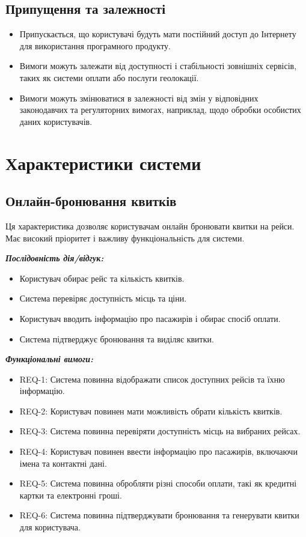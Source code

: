 \documentclass[14pt]{extreport}
\begin{document}
\begin{normalsize}
	\subsection*{Припущення та залежності}
	\begin{itemize}
		\item Припускається, що користувачі будуть мати постійний доступ до Інтернету для використання програмного продукту.
		\item Вимоги можуть залежати від доступності і стабільності зовнішніх сервісів, таких як системи оплати або послуги геолокації.
		\item Вимоги можуть змінюватися в залежності від змін у відповідних законодавчих та регуляторних вимогах, наприклад, щодо обробки особистих даних користувачів.
	\end{itemize}
	
	\section*{Характеристики системи}
	
	\subsection*{Онлайн-бронювання квитків} 
	Ця характеристика дозволяє користувачам онлайн бронювати квитки на рейси. Має високий пріоритет і важливу функціональність для системи.
	
	\textbf{\textit{Послідовність дія/відгук:}}
	\begin{itemize}
		\item Користувач обирає рейс та кількість квитків.
		\item Система перевіряє доступність місць та ціни.
		\item Користувач вводить інформацію про пасажирів і обирає спосіб оплати.
		\item Система підтверджує бронювання та виділяє квитки.
	\end{itemize}
	
	\textbf{\textit{Функціональні вимоги:}}
	\begin{itemize}
		\item REQ-1: Система повинна відображати список доступних рейсів та їхню інформацію.
		\item REQ-2: Користувач повинен мати можливість обрати кількість квитків.
		\item REQ-3: Система повинна перевіряти доступність місць на вибраних рейсах.
		\item REQ-4: Користувач повинен ввести інформацію про пасажирів, включаючи імена та контактні дані.
		\item REQ-5: Система повинна обробляти різні способи оплати, такі як кредитні картки та електронні гроші.
		\item REQ-6: Система повинна підтверджувати бронювання та генерувати квитки для користувача.
	\end{itemize}
	

\end{normalsize}
\end{document}
